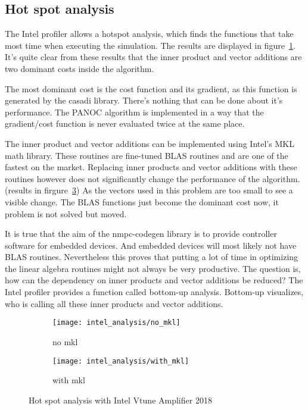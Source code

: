\subsection{Hot spot analysis}
The Intel profiler allows a hotspot analysis, which finds the functions that take most time when executing the simulation. The results are displayed in figure~\ref{fig:hotspot no mkl}.  It's quite clear from these results that the inner product and vector additions are two dominant costs inside the algorithm.

The most dominant cost is the cost function and its gradient, as this function is generated by the casadi library. There's nothing that can be done about it's performance. The PANOC algorithm is implemented in a way that the gradient/cost function is never evaluated twice at the same place.

The inner product and vector additions can be implemented using Intel's MKL math library. These routines are fine-tuned BLAS routines and are one of the fastest on the market. Replacing inner products and vector additions with these routines however does not significantly change the performance of the algorithm.(results in firgure~\ref{fig:hotspot with mkl}) As the vectors used in this problem are too small to see a visible change. The BLAS functions just become the dominant cost now, it problem is not solved but moved.

It is true that the aim of the nmpc-codegen library is to provide controller software for embedded devices. And embedded devices will most likely not have BLAS routines. Nevertheless this proves that putting a lot of time in optimizing the linear algebra routines might not always be very productive. The question is, how can the dependency on inner products and vector additions be reduced? The Intel profiler provides a function called bottom-up analysis. Bottom-up visualizes, who is calling all these inner products and vector additions.

\begin{figure}[H]
	\centering
	\begin{subfigure}[b]{0.45\textwidth}
		\centering
		\texttt{[image: intel\_analysis/no\_mkl]}
		\caption{no mkl}
		\label{fig:hotspot no mkl}
	\end{subfigure}
	\hfill
	\begin{subfigure}[b]{0.45\textwidth}
		\centering
		\texttt{[image: intel\_analysis/with\_mkl]}
		\caption{with mkl}
		\label{fig:hotspot with mkl}
	\end{subfigure}
	\caption{Hot spot analysis with Intel Vtune Amplifier 2018}
\end{figure}

